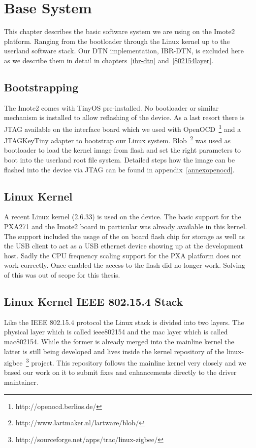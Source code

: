 \chapter{Base System}
This chapter describes the basic software system we are using on the Imote2
platform. Ranging from the bootloader through the Linux kernel up to the
userland software stack. Our DTN implementation, IBR-DTN, is excluded here as we
describe them in detail in chapters~\ref{ibr-dtn} and~\ref{802154layer}.

\section{Bootstrapping}
The Imote2 comes with TinyOS pre-installed. No bootloader or similar mechanism
is installed to allow reflashing of the device. As a last resort there is JTAG
available on the interface board which we used  with OpenOCD~\footnote{http://openocd.berlios.de/} and a
JTAGKeyTiny adapter to bootstrap our Linux system. Blob~\footnote{http://www.lartmaker.nl/lartware/blob/} was used as bootloader to
load the kernel image from flash and set the right parameters to boot into the
userland root file system. Detailed steps how the image can be flashed into the
device via JTAG can be found in appendix~\ref{annexopenocd}.

\section{Linux Kernel}
A recent Linux kernel (2.6.33) is used on the device. The basic support for the
PXA271 and the Imote2 board in particular was already available in this kernel.
The support included the usage of the on board flash chip for storage as well as
the USB client to act as a USB ethernet device showing up at the development host.
Sadly the CPU frequency scaling support for the PXA platform does not work
correctly. Once enabled the access to the flash did no longer work.
Solving of this was out of scope for this thesis.

\section{Linux Kernel IEEE 802.15.4 Stack}
Like the IEEE 802.15.4 protocol the Linux stack is divided into two layers. The
physical layer which is called ieee802154 and the mac layer which is called
mac802154. While the former is already merged into the mainline kernel the latter
is still being developed and lives inside the kernel repository of the
linux-zigbee~\footnote{http://sourceforge.net/apps/trac/linux-zigbee/} project.
This repository follows the mainline kernel very closely and we based our work
on it to submit fixes and enhancements directly to the driver maintainer.

